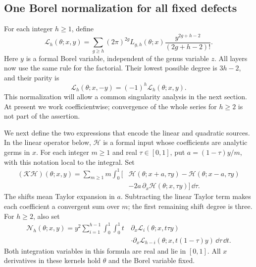 \subsection{One Borel normalization for all fixed defects}
\label{subsec:s07:04}

For each integer $h\geq1$, define
\begin{equation}\label{eq:s07:borel}
 \mathcal L_h(\theta;x,y)
 =\sum_{g\geq h}(2\pi)^{2g}L_{g,h}(\theta;x)
                         \frac{y^{2g+h-2}}{(2g+h-2)!}.
\end{equation}
Here $y$ is a formal Borel variable, independent of the genus variable
$z$. All layers now use the same rule for the factorial. Their lowest
possible degree is
$3h-2$, and their parity is
\begin{equation}\label{eq:s07:borel-parity}
 \mathcal L_h(\theta;x,-y)=(-1)^h\mathcal L_h(\theta;x,y).
\end{equation}
This normalization will allow a common singularity analysis in the
next section. At present we work coefficientwise; convergence of the
whole series for $h\geq2$ is not part of the assertion.

We next define the two expressions that encode the linear and
quadratic sources. In the linear operator below, $\mathcal H$ is a
formal input whose coefficients are analytic germs in $x$.
For each integer $m\geq1$ and real $\tau\in[0,1]$, put
$a=(1-\tau)y/m$, with this notation local to the integral. Set
\begin{equation}\label{eq:s07:linear-kernel}
 \begin{aligned}
 (\mathcal K\mathcal H)(\theta;x,y)
 =\sum_{m\geq1}m\int_0^1
 \bigl[&\mathcal H(\theta;x+a,\tau y)
             -\mathcal H(\theta;x-a,\tau y)\\
       &-2a\,\partial_x\mathcal H(\theta;x,\tau y)\bigr]\,\dd\tau.
 \end{aligned}
\end{equation}
The shifts mean Taylor expansion in $a$. Subtracting the linear
Taylor term makes each coefficient a convergent sum over $m$;
the first remaining shift degree is three. For $h\geq2$, also set
\begin{equation}\label{eq:s07:quadratic-kernel}
 \begin{aligned}
 \mathcal N_h(\theta;x,y)
 =y^2\sum_{i=1}^{h-1}\int_0^1\int_0^1
 t\,&\partial_x\mathcal L_i(\theta;x,t\tau y)\\
 &\cdot\partial_x\mathcal L_{h-i}(\theta;x,t(1-\tau)y)
                                      \,\dd\tau\,\dd t.
 \end{aligned}
\end{equation}
Both integration variables in this formula are real and lie in
$[0,1]$. All $x$ derivatives in these kernels hold $\theta$ and the
Borel variable fixed.

